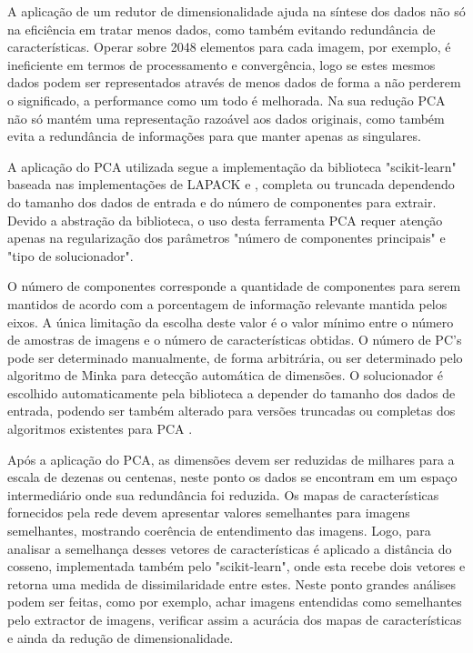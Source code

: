 \documentclass[12pt]{report}
\begin{document}
A aplicação de um redutor de dimensionalidade ajuda na síntese dos dados não só na eficiência em tratar menos dados, como também evitando redundância de características. Operar sobre 2048 elementos para cada imagem, por exemplo, é ineficiente em termos de processamento e convergência, logo se estes mesmos dados podem ser representados através de menos dados de forma a não perderem o significado, a performance como um todo é melhorada. Na sua redução \ac{PCA} não só mantém uma representação razoável aos dados originais, como também evita a redundância de informações para que manter apenas as singulares.

A aplicação do \ac{PCA} utilizada segue a implementação da biblioteca "scikit-learn" \cite{sklearnPCA} baseada nas implementações de LAPACK \cite{LAPACK} e \cite{truncated}, completa ou truncada dependendo do tamanho dos dados de entrada e do número de componentes para extrair. Devido a abstração da biblioteca, o uso desta ferramenta \ac{PCA} requer atenção apenas na regularização dos parâmetros "número de componentes principais" e "tipo de solucionador". 

O número de componentes corresponde a quantidade de componentes para serem mantidos de acordo com a porcentagem de informação relevante mantida pelos eixos. A única limitação da escolha deste valor é o valor mínimo entre o número de amostras de imagens e o número de características obtidas. O número de PC's pode ser determinado manualmente, de forma arbitrária, ou ser determinado pelo algoritmo de Minka \cite{minka} para detecção automática de dimensões. O solucionador é escolhido automaticamente pela biblioteca a depender do tamanho dos dados de entrada, podendo ser também alterado para versões truncadas ou completas dos algoritmos existentes para PCA \cite{sklearnPCA}.

Após a aplicação do PCA, as dimensões devem ser reduzidas de milhares para a escala de dezenas ou centenas, neste ponto os dados se encontram em um espaço intermediário onde sua redundância foi reduzida. Os mapas de características fornecidos pela rede devem apresentar valores semelhantes para imagens semelhantes, mostrando coerência de entendimento das imagens. Logo, para analisar a semelhança desses vetores de características é aplicado a distância do cosseno, implementada também pelo "scikit-learn", onde esta recebe dois vetores e retorna uma medida de dissimilaridade entre estes. Neste ponto grandes análises podem ser feitas, como por exemplo, achar imagens entendidas como semelhantes pelo extractor de imagens, verificar assim a acurácia dos mapas de características e ainda da redução de dimensionalidade.
\end{document}
